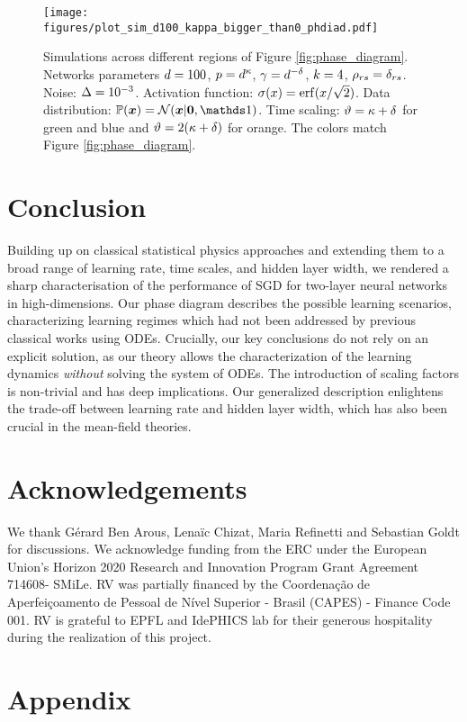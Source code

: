 \documentclass[10pt]{article}
\begin{document}
\begin{figure}[tb!]
\begin{center}
\centerline{\texttt{[image: figures/plot\_sim\_d100\_kappa\_bigger\_than0\_phdiad.pdf]}}
\vskip -0.05in
\caption{Simulations across different regions of Figure \ref{fig:phase_diagram}. Networks parameters $d=100$, $p=d^\kappa$, $\gamma= d^{-\delta}$, $k=4$, $\rho_{rs} = \delta_{rs}$. Noise: $\Delta = 10^{-3}$. Activation function: $\act(x) = \erf(x/\sqrt{2})$. Data distribution: $\Prob (\x) =  \gauss(\x | \bm{0}, \Id )$. Time scaling: $\vartheta = \kappa+\delta$ for green and blue and $\vartheta = 2(\kappa+\delta)$ for orange. The colors match Figure \ref{fig:phase_diagram}.}
\label{fig:simul_phdiagr}
\end{center}
\vskip -0.2in
\end{figure}
\section{Conclusion}
Building up on classical statistical physics approaches and extending them to a broad range of learning rate, time scales, and hidden layer width, we rendered a sharp characterisation of the performance of SGD for two-layer neural networks in high-dimensions. Our phase diagram describes the possible learning scenarios, characterizing learning regimes which had not been addressed by previous classical works using ODEs. Crucially, our key conclusions do not rely on an explicit solution, as our theory allows the characterization of the learning dynamics {\it without} solving the system of ODEs. The introduction of scaling factors is non-trivial and has deep implications. Our generalized description enlightens the trade-off between learning rate and hidden layer width, which has also been crucial in the mean-field theories.
\section*{Acknowledgements}
We thank G\'erard Ben Arous, Lena{\"i}c Chizat, Maria Refinetti and Sebastian Goldt for discussions. We acknowledge funding from the ERC under the European Union’s Horizon 2020 Research and Innovation Program Grant Agreement 714608- SMiLe. RV was partially financed by the Coordena\c{c}\~{a}o de Aperfeiçoamento de Pessoal de N\'{i}vel Superior - Brasil (CAPES) - Finance Code 001. RV is grateful to EPFL and IdePHICS lab for their generous hospitality during the realization of this project.


\newpage
\appendix
\section*{Appendix}\label{sec:app}





\newpage


\typeout{}
\end{document}
